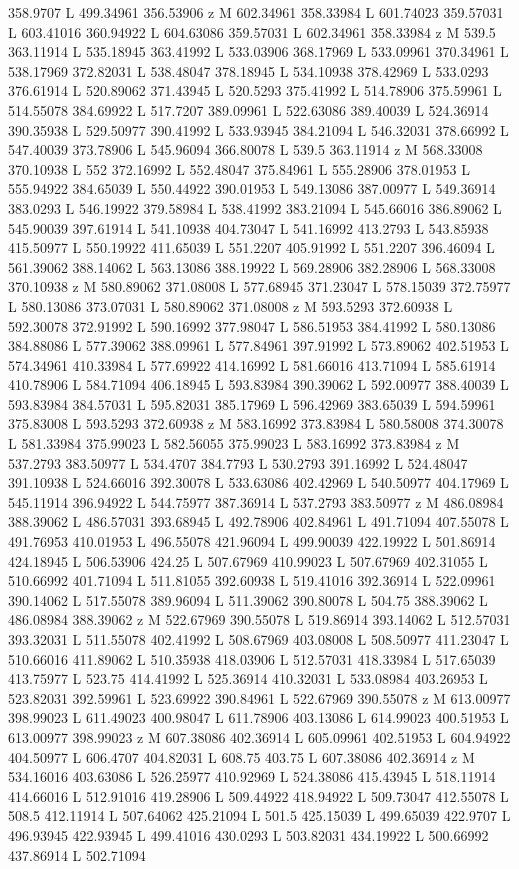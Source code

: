 {\begin{scope}[local bounding box=bb]
{358.9707 L 499.34961 356.53906 z M 602.34961 358.33984 L 601.74023 359.57031 L 603.41016 360.94922 L 604.63086 359.57031 L 602.34961 358.33984 z M 539.5 363.11914 L 535.18945 363.41992 L 533.03906 368.17969 L 533.09961 370.34961 L 538.17969 372.82031 L 538.48047 378.18945 L 534.10938 378.42969 L 533.0293 376.61914 L 520.89062 371.43945 L 520.5293 375.41992 L 514.78906 375.59961 L 514.55078 384.69922 L 517.7207 389.09961 L 522.63086 389.40039 L 524.36914 390.35938 L 529.50977 390.41992 L 533.93945 384.21094 L 546.32031 378.66992 L 547.40039 373.78906 L 545.96094 366.80078 L 539.5 363.11914 z M 568.33008 370.10938 L 552 372.16992 L 552.48047 375.84961 L 555.28906 378.01953 L 555.94922 384.65039 L 550.44922 390.01953 L 549.13086 387.00977 L 549.36914 383.0293 L 546.19922 379.58984 L 538.41992 383.21094 L 545.66016 386.89062 L 545.90039 397.61914 L 541.10938 404.73047 L 541.16992 413.2793 L 543.85938 415.50977 L 550.19922 411.65039 L 551.2207 405.91992 L 551.2207 396.46094 L 561.39062 388.14062 L 563.13086 388.19922 L 569.28906 382.28906 L 568.33008 370.10938 z M 580.89062 371.08008 L 577.68945 371.23047 L 578.15039 372.75977 L 580.13086 373.07031 L 580.89062 371.08008 z M 593.5293 372.60938 L 592.30078 372.91992 L 590.16992 377.98047 L 586.51953 384.41992 L 580.13086 384.88086 L 577.39062 388.09961 L 577.84961 397.91992 L 573.89062 402.51953 L 574.34961 410.33984 L 577.69922 414.16992 L 581.66016 413.71094 L 585.61914 410.78906 L 584.71094 406.18945 L 593.83984 390.39062 L 592.00977 388.40039 L 593.83984 384.57031 L 595.82031 385.17969 L 596.42969 383.65039 L 594.59961 375.83008 L 593.5293 372.60938 z M 583.16992 373.83984 L 580.58008 374.30078 L 581.33984 375.99023 L 582.56055 375.99023 L 583.16992 373.83984 z M 537.2793 383.50977 L 534.4707 384.7793 L 530.2793 391.16992 L 524.48047 391.10938 L 524.66016 392.30078 L 533.63086 402.42969 L 540.50977 404.17969 L 545.11914 396.94922 L 544.75977 387.36914 L 537.2793 383.50977 z M 486.08984 388.39062 L 486.57031 393.68945 L 492.78906 402.84961 L 491.71094 407.55078 L 491.76953 410.01953 L 496.55078 421.96094 L 499.90039 422.19922 L 501.86914 424.18945 L 506.53906 424.25 L 507.67969 410.99023 L 507.67969 402.31055 L 510.66992 401.71094 L 511.81055 392.60938 L 519.41016 392.36914 L 522.09961 390.14062 L 517.55078 389.96094 L 511.39062 390.80078 L 504.75 388.39062 L 486.08984 388.39062 z M 522.67969 390.55078 L 519.86914 393.14062 L 512.57031 393.32031 L 511.55078 402.41992 L 508.67969 403.08008 L 508.50977 411.23047 L 510.66016 411.89062 L 510.35938 418.03906 L 512.57031 418.33984 L 517.65039 413.75977 L 523.75 414.41992 L 525.36914 410.32031 L 533.08984 403.26953 L 523.82031 392.59961 L 523.69922 390.84961 L 522.67969 390.55078 z M 613.00977 398.99023 L 611.49023 400.98047 L 611.78906 403.13086 L 614.99023 400.51953 L 613.00977 398.99023 z M 607.38086 402.36914 L 605.09961 402.51953 L 604.94922 404.50977 L 606.4707 404.82031 L 608.75 403.75 L 607.38086 402.36914 z M 534.16016 403.63086 L 526.25977 410.92969 L 524.38086 415.43945 L 518.11914 414.66016 L 512.91016 419.28906 L 509.44922 418.94922 L 509.73047 412.55078 L 508.5 412.11914 L 507.64062 425.21094 L 501.5 425.15039 L 499.65039 422.9707 L 496.93945 422.93945 L 499.41016 430.0293 L 503.82031 434.19922 L 500.66992 437.86914 L 502.71094 }
\end{scope}}
